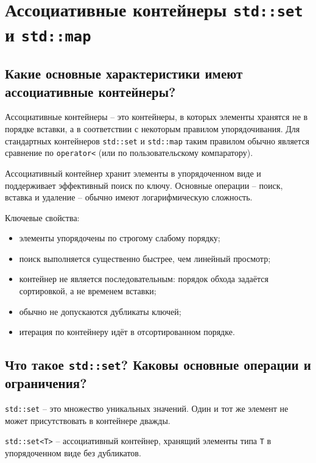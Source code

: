 \section{Ассоциативные контейнеры \texttt{std::set} и \texttt{std::map}}

\subsection{Какие основные характеристики имеют ассоциативные контейнеры?}
Ассоциативные контейнеры -- это контейнеры, в которых элементы хранятся не в порядке вставки, а в соответствии с некоторым правилом упорядочивания. Для стандартных контейнеров \texttt{std::set} и \texttt{std::map} таким правилом обычно является сравнение по \texttt{operator<} (или по пользовательскому компаратору).

\begin{definition}
Ассоциативный контейнер хранит элементы в упорядоченном виде и поддерживает эффективный поиск по ключу. Основные операции -- поиск, вставка и удаление -- обычно имеют логарифмическую сложность.
\end{definition}

Ключевые свойства:
\begin{itemize}
    \item элементы упорядочены по строгому слабому порядку;
    \item поиск выполняется существенно быстрее, чем линейный просмотр;
    \item контейнер не является последовательным: порядок обхода задаётся сортировкой, а не временем вставки;
    \item обычно не допускаются дубликаты ключей;
    \item итерация по контейнеру идёт в отсортированном порядке.
\end{itemize}

\subsection{Что такое \texttt{std::set}? Каковы основные операции и ограничения?}
\texttt{std::set} -- это множество уникальных значений. Один и тот же элемент не может присутствовать в контейнере дважды.

\begin{definition}
\texttt{std::set<T>} -- ассоциативный контейнер, хранящий элементы типа \texttt{T} в упорядоченном виде без дубликатов.
\end{definition}

